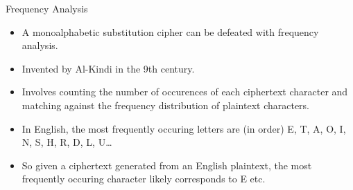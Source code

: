 \documentclass[presentation]{beamer}
\begin{document}
\begin{frame}[label=sec-11]{Frequency Analysis}
\begin{itemize}[<+->]
\item A monoalphabetic substitution cipher can be defeated with frequency analysis.
\item Invented by Al-Kindi in the 9th century.
\item Involves counting the number of occurences of each ciphertext character and matching against the frequency distribution of plaintext characters.
\item In English, the most frequently occuring letters are (in order) E, T, A, O, I, N, S, H, R, D, L, U\ldots{}
\item So given a ciphertext generated from an English plaintext, the most frequently occuring character likely corresponds to E etc.
\end{itemize}
\end{frame}
\end{document}
